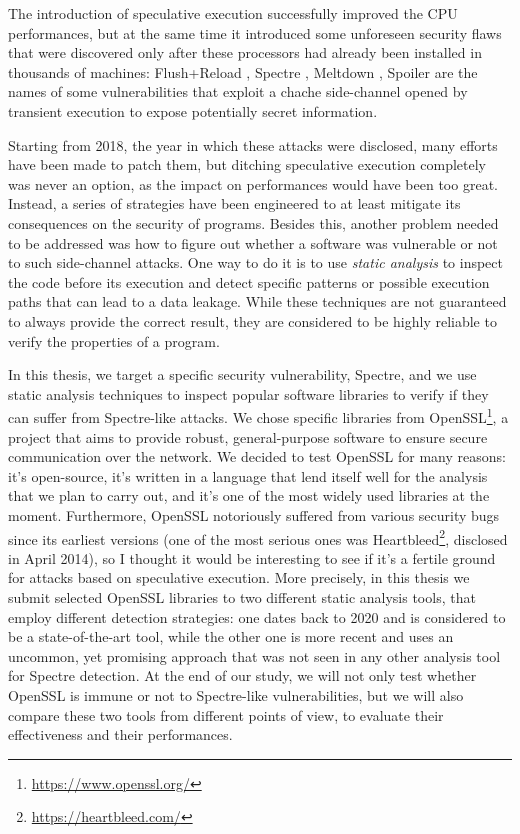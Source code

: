 \documentclass[12pt,a4paper]{book}
\theoremstyle{definition}
\begin{document}
	The introduction of speculative execution successfully improved the CPU performances, but at the same time it introduced some unforeseen security flaws that were discovered only after these processors had already been installed in thousands of machines: Flush+Reload \cite{Yarom2014}, Spectre \cite{Kocher2019}, Meltdown \cite{Lipp2018}, Spoiler \cite{Islam2019} are the names of some vulnerabilities that exploit a chache side-channel opened by transient execution to expose potentially secret information.
	
	Starting from 2018, the year in which these attacks were disclosed, many efforts have been made to patch them, but ditching speculative execution completely was never an option, as the impact on performances would have been too great. Instead, a series of strategies have been engineered to at least mitigate its consequences on the security of programs. Besides this, another problem needed to be addressed was how to figure out whether a software was vulnerable or not to such side-channel attacks. One way to do it is to use \textit{static analysis} to inspect the code before its execution and detect specific patterns or possible execution paths that can lead to a data leakage. While these techniques are not guaranteed to always provide the correct result, they are considered to be highly reliable to verify the properties of a program.
	
	In this thesis, we target a specific security vulnerability, Spectre, and we use static analysis techniques to inspect popular software libraries to verify if they can suffer from Spectre-like attacks. We chose specific libraries from OpenSSL\footnote{\url{https://www.openssl.org/}}, a project that aims to provide robust, general-purpose software to ensure secure communication over the network. We decided to test OpenSSL for many reasons: it's open-source, it's written in a language that lend itself well for the analysis that we plan to carry out, and it's one of the most widely used libraries at the moment. Furthermore, OpenSSL notoriously suffered from various security bugs since its earliest versions (one of the most serious ones was Heartbleed\footnote{\url{https://heartbleed.com/}}, disclosed in April 2014), so I thought it would be interesting to see if it's a fertile ground for attacks based on speculative execution. More precisely, in this thesis we submit selected OpenSSL libraries to two different static analysis tools, that employ different detection strategies: one dates back to 2020 and is considered to be a state-of-the-art tool, while the other one is more recent and uses an uncommon, yet promising approach that was not seen in any other analysis tool for Spectre detection. At the end of our study, we will not only test whether OpenSSL is immune or not to Spectre-like vulnerabilities, but we will also compare these two tools from different points of view, to evaluate their effectiveness and their performances.
	
\end{document}
